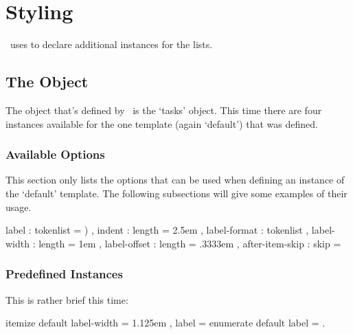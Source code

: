 \documentclass{tasks-manual}
\begin{document}
\section{Styling \Tasks}
\Tasks\ uses  to declare additional instances for the lists.

\subsection{The  Object}\label{sec:tasks}
The object that's defined by \Tasks\ is the `tasks' object.  This time there
are four instances available for the one template (again `default') that was
defined.

\subsubsection{Available Options}
This section only lists the options that can be used when defining an instance
of the `default' template.  The following subsections will give some examples
of their usage.

\begin{sourcecode}
    {
      label           : tokenlist = \alph*) ,
      indent          : length    = 2.5em   ,
      label-format    : tokenlist           ,
      label-width     : length    = 1em     ,
      label-offset    : length    = .3333em ,
      after-item-skip : skip      = \itemsep
    }
\end{sourcecode}

\subsubsection{Predefined Instances}
This is rather brief this time:
\begin{sourcecode}
   {itemize} {default}
    {
      label-width  = 1.125em ,
      label        = 
    }
   {enumerate} {default}
    { label = \arabic*. }
\end{sourcecode}

\printbibliography
\end{document}
